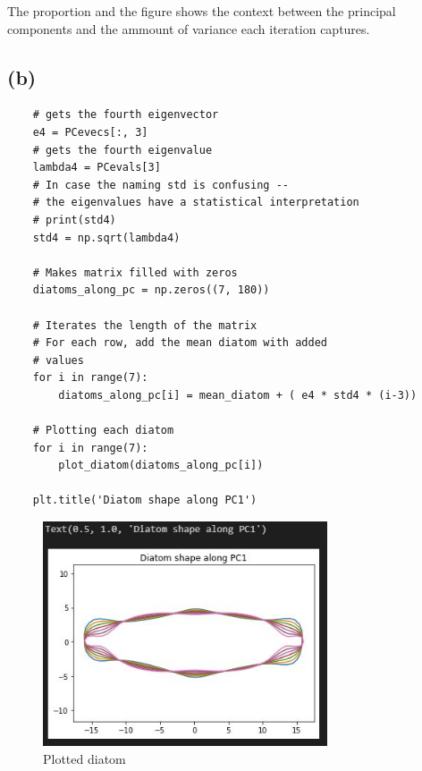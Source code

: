 \noindent The proportion and the figure shows the context between the principal components and the ammount of
variance each iteration captures.

\newpage

\subsection{(b)}

\begin{verbatim}
    # gets the fourth eigenvector
    e4 = PCevecs[:, 3] 
    # gets the fourth eigenvalue
    lambda4 = PCevals[3] 
    # In case the naming std is confusing -- 
    # the eigenvalues have a statistical interpretation
    # print(std4)
    std4 = np.sqrt(lambda4) 

    # Makes matrix filled with zeros
    diatoms_along_pc = np.zeros((7, 180))

    # Iterates the length of the matrix
    # For each row, add the mean diatom with added
    # values
    for i in range(7):
        diatoms_along_pc[i] = mean_diatom + ( e4 * std4 * (i-3))
        
    # Plotting each diatom
    for i in range(7):
        plot_diatom(diatoms_along_pc[i])

    plt.title('Diatom shape along PC1')
\end{verbatim}

\begin{figure}[H]
    \centering
    \includegraphics[width=0.75\textwidth]{Figures/Result_of_diatoms.JPG}
    \caption{Plotted diatom}
\end{figure}


